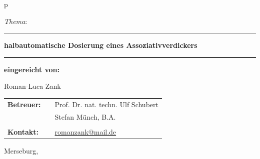 \begin{center}
\begin{tabular}{p{\textwidth}}
\vspace*{5.5mm}

\begin{center}
	\LARGE{\textit{Thema}:}
\end{center}

\vspace{-5.5mm}

\rule{\textwidth}{0.4pt}
\begin{center}
\textbf{\LARGE{halbautomatische Dosierung eines Assoziativverdickers}}
\end{center}
\vspace*{-5mm}
\rule{\textwidth}{0.4pt}

\vspace*{13.5mm}

\begin{center}
\Large{\textbf{eingereicht von:}} \\ 
\end{center}
\begin{center}
\Large{Roman-Luca Zank} \\
\end{center}


\vspace*{13.5mm}

\begin{center}
\begin{tabular}{lll}
\Large{\textbf{Betreuer:}}&& \Large{Prof. Dr. nat. techn. Ulf Schubert}\\
&& \Large{Stefan Münch, B.A.}\\
&&\\
\Large{\textbf{Kontakt:}}&& \Large{\href{mailto:romanzank@mail.de}{romanzank@mail.de} }\\
\end{tabular}
\end{center}

\end{tabular}
\end{center}

\vfill

\large{Merseburg, \todayDE}
